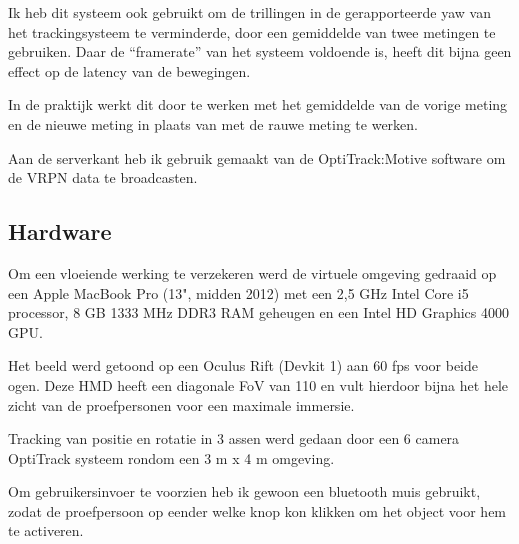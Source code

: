 Ik heb dit systeem ook gebruikt om de trillingen in de gerapporteerde yaw van het
trackingsysteem te verminderde, door een gemiddelde van twee metingen te
gebruiken. Daar de ``framerate'' van het systeem voldoende is, heeft dit bijna 
geen effect op de latency van de bewegingen.

In de praktijk werkt dit door te werken met het gemiddelde van de vorige meting
en de nieuwe meting in plaats van met de rauwe meting te werken.

Aan de serverkant heb ik gebruik gemaakt van de OptiTrack:Motive software om de
VRPN data te broadcasten.

\subsection{Hardware}
Om een vloeiende werking te verzekeren werd de virtuele omgeving gedraaid op een
Apple MacBook Pro (13", midden 2012) met een 2,5 GHz Intel Core i5 processor, 
8 GB 1333 MHz DDR3 RAM geheugen en een Intel HD Graphics 4000 GPU.

Het beeld werd getoond op een Oculus Rift (Devkit 1) aan 60 fps voor beide ogen.
Deze HMD heeft een diagonale FoV van 110\textdegree{} en vult hierdoor bijna het
hele zicht van de proefpersonen voor een maximale immersie.

Tracking van positie en rotatie in 3 assen werd gedaan door een 6 camera
OptiTrack systeem rondom een 3 m x 4 m omgeving.

Om gebruikersinvoer te voorzien heb ik gewoon een bluetooth muis gebruikt, zodat
de proefpersoon op eender welke knop kon klikken om het object voor hem te
activeren.